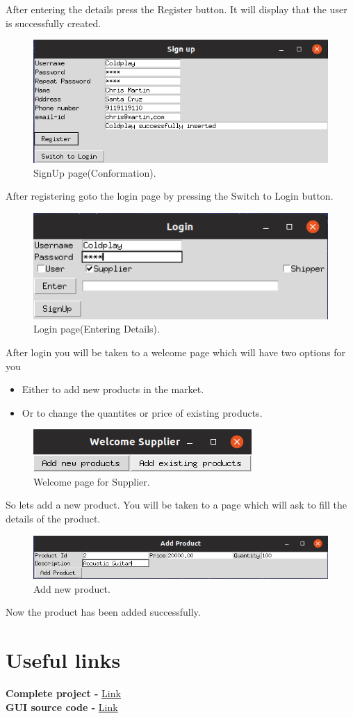 \documentclass[a4paper,12pt]{article}
\begin{document}
After entering the details press the Register button. It will display that the user is successfully created.
\begin{figure}[H]
    \centering
    \includegraphics[scale=0.5]{signup3.png}
    \caption{SignUp page(Conformation).}
\end{figure}
After registering goto the login page by pressing the Switch to Login button.
\begin{figure}[H]
    \centering
    \includegraphics[scale=0.5]{login2.png} 
    \caption{Login page(Entering Details).}
\end{figure}
After login you will be taken to a welcome page which will have two options for you 
\begin{itemize}
    \item Either to add new products in the market.
    \item Or to change the quantites or price of existing products. 
\end{itemize}
\begin{figure}[H]
    \centering
    \includegraphics[scale=0.5]{supp1.png} 
    \caption{Welcome page for Supplier.}
\end{figure}
So lets add a new product. You will be taken to a page which will ask to fill the details of the product.
\begin{figure}[H]
    \centering
    \includegraphics[scale=0.5]{supp2.png} 
    \caption{Add new product.}
\end{figure}
Now the product has been added successfully.

\newpage
\section{Useful links}
\begin{center}
\textbf{Complete project - } \href{https://github.com/nikhilyadv/DBMS-Lab-Project}{Link}\\
\textbf{GUI source code - } \href{https://github.com/nikhilyadv/DBMS-Lab-Project/tree/master/GUI}{Link}
\end{center}
\end{document}
